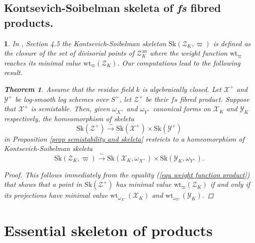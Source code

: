 \documentclass{amsart}%
\numberwithin{equation}{subsection}
\theoremstyle{plain2}
\newtheorem{thm}[equation]{Theorem}
\newtheorem{cor}[equation]{Corollary}
\theoremstyle{definition2}
\theoremstyle{stepstyle}
\theoremstyle{point}
\theoremstyle{subpoint}
\newtheorem{subpoint}[equation]{}%
\newcommand{\spa}[1]{\begin{subpoint}#1\end{subpoint}}           %
\newcommand{\cX}{\ensuremath{\mathscr{X}}}
\newcommand{\cY}{\ensuremath{\mathscr{Y}}}
\newcommand{\cZ}{\ensuremath{\mathscr{Z}}}
\renewcommand{\cZ}{\ensuremath{\mathscr{Z}}}
\renewcommand{\cY}{\ensuremath{\mathscr{Y}}}
\newcommand{\weight}{\mathrm{wt}}
\newcommand{\Sk}{\mathrm{Sk}}
\begin{document}
\subsection{Kontsevich-Soibelman skeleta of \textit{fs} fibred products.}
\spa{In \cite{MustataNicaise}, Section 4.5 the Kontsevich-Soibelman skeleton $\Sk(\cZ_K, \varpi)$ is defined as the closure of the set of divisorial points of $\cZ_K^\text{an}$ where the weight function $\weight_\varpi$ reaches its minimal value $\weight_{\varpi}(\cZ_K)$. Our computations lead to the following result.
\begin{thm}
%
\label{thm semistability and KS skeleta}
Assume that the residue field $k$ is algebraically closed. Let $\cX^+$ and $\cY^+$ be log-smooth log schemes over $S^+$, let $\cZ^+$ be their $fs$ fibred product. Suppose that $\cX^+$ is semistable. Then, given $\omega_{X^+}$ and $\omega_{Y^+}$ canonical forms on $\cX_K$ and $\cY_K$ respectively, the homeomorphism of skeleta $$\Sk(\cZ^+) \xrightarrow{\sim} \Sk(\cX^+) \times \Sk(\cY^+)$$ in Proposition \ref{prop semistability and skeleta} restricts to a homeomorphism of Kontsevich-Soibelman skeleta $$\Sk(\cZ_K, \varpi) \xrightarrow{\sim} \Sk(\cX_K, \omega_{X^+}) \times \Sk(\cY_K, \omega_{Y^+}).$$ 
\end{thm}
\begin{proof}
This follows immediately from the equality (\ref{equ weight function product}) that shows that a point in $\Sk(\cZ^+)$ has minimal value $\weight_{\varpi}(\cZ_K)$ if and only if its projections have minimal value $\weight_{\omega_{X^+}}(\cX_K)$ and $\weight_{\omega_{Y^+}}(\cY_K)$.
\end{proof}
}

\section{Essential skeleton of products}
\end{document}
